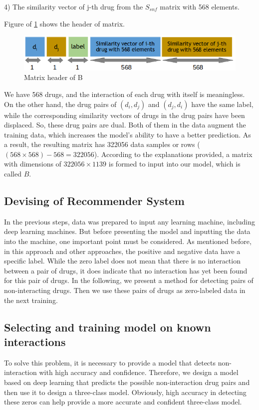 \documentclass{bmcart}
\begin{document}
4) The similarity vector of j-th drug from the $S_{snf}$ matrix with 568 elements.

Figure of \ref{BMatHeader} shows the header of matrix.

\begin{figure}[!h]
	\centering
	\includegraphics[scale=.53]{MatrixheaderB.png}
	\caption{Matrix header of B}
	\label{BMatHeader}
\end{figure}

We have 568 drugs, and the interaction of each drug with itself is meaningless. On the other hand, the drug pairs of $(d_i, d_j)$ and $(d_j, d_i)$ have the same label, while the corresponding similarity vectors of drugs in the drug pairs have been displaced. So, these drug pairs are dual. Both of them in the data augment the training data, which increases the model's ability to have a better prediction. As a result, the resulting matrix has 322056 data samples or rows ($(568 \times 568) - 568 = 322056$). According to the explanations provided, a matrix with dimensions of $322056 \times 1139$ is formed to input into our model, which is called $B$.

\subsection*{Devising of Recommender System}
In the previous steps, data was prepared to input any learning machine, including deep learning machines. But before presenting the model and inputting the data into the machine, one important point must be considered. As mentioned before, in this approach and other approaches, the positive and negative data have a specific label. While the zero label does not mean that there is no interaction between a pair of drugs, it does indicate that no interaction has yet been found for this pair of drugs. In the following, we present a method for detecting pairs of non-interacting drugs. Then we use these pairs of drugs as zero-labeled data in the next training.

\subsection*{Selecting and training model on known interactions}
To solve this problem, it is necessary to provide a model that detects non-interaction with high accuracy and confidence. Therefore, we design a model based on deep learning that predicts the possible non-interaction drug pairs and then use it to design a three-class model. Obviously, high accuracy in detecting these zeros can help provide a more accurate and confident three-class model.
\end{document}
